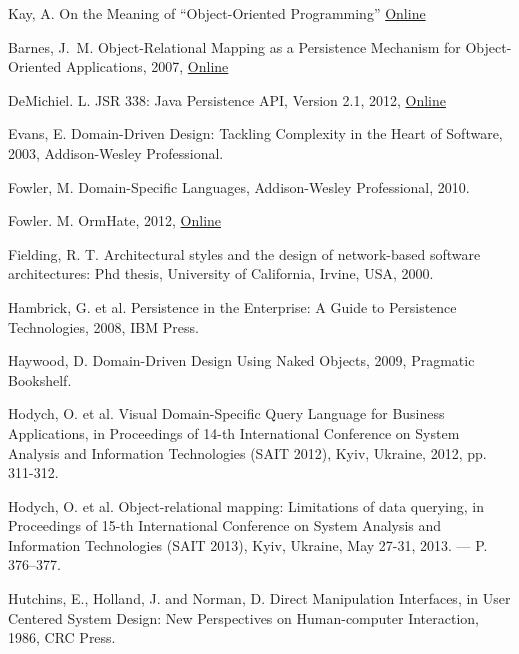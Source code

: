 \documentclass[a4paper,12pt,oneside,openright,final]{memoir} %
\begin{document}
\fi

%
%
\begin{thebibliography}{5}

Kay, A. On the Meaning of ``Object-Oriented Programming''
\href{http://www.purl.org/stefan_ram/pub/doc_kay_oop_en}{Online}

Bar\-nes, J.~M. Object-Relational Mapping as a Persistence Mechanism for Object-Oriented Applications, 2007,
\href{http://digitalcommons.macalester.edu/mathcs_honors/6/}{Online}

De\-Mi\-chiel. L. JSR 338: Java Persistence API, Version 2.1, 2012,
\href{http://jcp.org/aboutJava/communityprocess/pr/jsr338/index.html}{Online}

Evans, E. Domain-Driven Design: Tackling Complexity in the Heart of Software, 2003, Addison-Wesley Professional.

Fow\-ler, M. Domain-Specific Languages, Addison-Wesley Professional, 2010.

Fow\-ler. M. OrmHate, 2012,
\href{http://martinfowler.com/bliki/OrmHate.html}{Online}

Fielding, R. T. Architectural styles and the design of network-based software architectures: Phd thesis, University of California, Irvine, USA, 2000.

Hambrick, G. et al. Persistence in the Enterprise: A Guide to Persistence Technologies, 2008, IBM Press.

Haywood, D. Domain-Driven Design Using Naked Objects, 2009, Pragmatic Bookshelf.

Hodych, O. et al. Visual Domain-Specific Query Language for Business Applications, in Proceedings of 14-th International Conference on System Analysis and Information Technologies (SAIT 2012), Kyiv, Ukraine, 2012, pp. 311-312.

Hodych, O. et al. Object-relational mapping: Limitations of data querying, in Proceedings of 15-th International Conference on System Analysis and Information Technologies (SAIT 2013), Kyiv, Ukraine, May 27-31, 2013. — P. 376–377.

Hutchins, E., Holland, J. and Norman, D. Direct Manipulation Interfaces, in User Centered System Design: New Perspectives on Human-computer Interaction, 1986, CRC Press.


\end{thebibliography}
\end{document}
